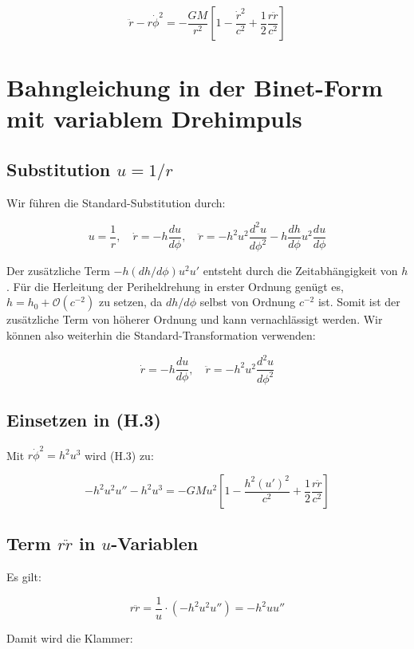 \[
\ddot{r} - r\dot{\phi}^2 = -\frac{GM}{r^2} 
\left[ 1 - \frac{\dot{r}^2}{c^2} + \frac{1}{2} \frac{r\ddot{r}}{c^2} \right] \tag{H.3}
\]

\section{Bahngleichung in der Binet-Form mit variablem Drehimpuls}
\label{app:periheldrehung_binet}

\subsection{Substitution \( u = 1/r \)}
\label{sub:periheldrehung_substitution}

Wir führen die Standard-Substitution durch:

\[
u = \frac{1}{r}, \quad \dot{r} = -h \frac{du}{d\phi}, \quad 
\ddot{r} = -h^2 u^2 \frac{d^2 u}{d\phi^2} - h \frac{dh}{d\phi} u^2 \frac{du}{d\phi}
\]

Der zusätzliche Term \( -h (dh/d\phi) u^2 u' \) entsteht durch die Zeitabhängigkeit von \( h \). Für die Herleitung der Periheldrehung in erster Ordnung genügt es, \( h = h_0 + \mathcal{O}(c^{-2}) \) zu setzen, da \( dh/d\phi \) selbst von Ordnung \( c^{-2} \) ist. Somit ist der zusätzliche Term von höherer Ordnung und kann vernachlässigt werden. Wir können also weiterhin die Standard-Transformation verwenden:

\[
\dot{r} = -h \frac{du}{d\phi}, \quad \ddot{r} = -h^2 u^2 \frac{d^2 u}{d\phi^2}
\]

\subsection{Einsetzen in (H.3)}
\label{sub:periheldrehung_einsetzen}

Mit \( r\dot{\phi}^2 = h^2 u^3 \) wird (H.3) zu:

\[
-h^2 u^2 u'' - h^2 u^3 = -GM u^2 \left[ 1 - \frac{h^2 (u')^2}{c^2} + \frac{1}{2} \frac{r\ddot{r}}{c^2} \right]
\]

\subsection{Term \( r\ddot{r} \) in \( u \)-Variablen}
\label{sub:periheldrehung_rr}

Es gilt:

\[
r\ddot{r} = \frac{1}{u} \cdot (-h^2 u^2 u'') = -h^2 u u''
\]

Damit wird die Klammer:

